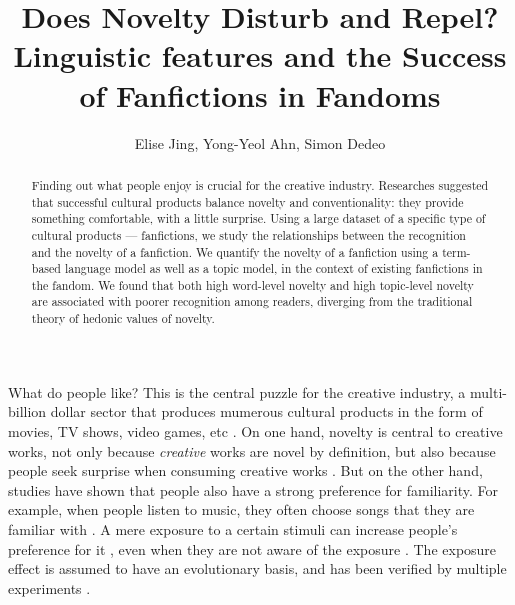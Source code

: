 \documentclass[letterpaper]{article} %
\begin{document}
%
\title{Does Novelty Disturb and Repel? Linguistic features and the Success of Fanfictions in Fandoms}
\author{Elise Jing, Yong-Yeol Ahn, Simon Dedeo\\
}
\maketitle
\begin{abstract}
Finding out what people enjoy is crucial for the creative industry. Researches suggested that successful cultural products balance novelty and conventionality: they provide something comfortable, with a little surprise. Using a large dataset of a specific type of cultural products --- fanfictions, we study the relationships between the recognition and the novelty of a fanfiction. We quantify the novelty of a fanfiction using a term-based language model as well as a topic model, in the context of existing fanfictions in the fandom. We found that both high word-level novelty and high topic-level novelty are associated with poorer recognition among readers, diverging from the traditional theory of hedonic values of novelty.
\end{abstract}

\noindent 
What do people like? This is the central puzzle for the creative industry, a multi-billion dollar sector that produces mumerous cultural products in the form of movies, TV shows, video games, etc \cite{creativeindustries}. On one hand, novelty is central to creative works, not only because \emph{creative} works are novel by definition, but also because people seek surprise when consuming creative works \cite{hutter2011infinite}. But on the other hand, studies have shown that people also have a strong preference for familiarity. For example, when people listen to music, they often choose songs that they are familiar with \cite{thompson2014shazam}. A mere exposure to a certain stimuli can increase people's preference for it \cite{zajonc1968attitudinal}, even when they are not aware of the exposure \cite{kunst1980affective}. The exposure effect is assumed to have an evolutionary basis, and has been verified by multiple experiments \cite{bornstein1989exposure}.
\end{document}
